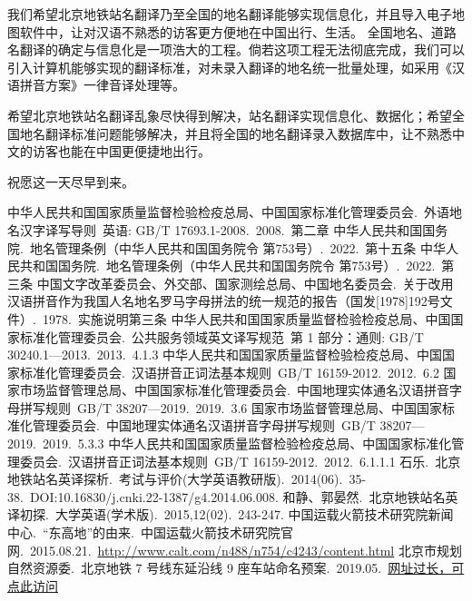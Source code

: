 \documentclass[a4paper,UTF8,12pt]{ctexart}
\begin{document}
    我们希望北京地铁站名翻译乃至全国的地名翻译能够实现信息化，并且导入电子地图软件中，让对汉语不熟悉的访客更方便地在中国出行、生活。
    全国地名、道路名翻译的确定与信息化是一项浩大的工程。倘若这项工程无法彻底完成，我们可以引入计算机能够实现的翻译标准，对未录入翻译的地名统一批量处理，如采用《汉语拼音方案》一律音译处理等。
    
    希望北京地铁站名翻译乱象尽快得到解决，站名翻译实现信息化、数据化；希望全国地名翻译标准问题能够解决，并且将全国的地名翻译录入数据库中，让不熟悉中文的访客也能在中国更便捷地出行。

    祝愿这一天尽早到来。

\begin{thebibliography}{100}

中华人民共和国国家质量监督检验检疫总局、中国国家标准化管理委员会.\ 外语地名汉字译写导则\ 英语: GB/T 17693.1-2008.\ 2008.\ 第二章
中华人民共和国国务院.\ 地名管理条例（中华人民共和国国务院令 第753号）.\ 2022.\ 第十五条
中华人民共和国国务院.\ 地名管理条例（中华人民共和国国务院令 第753号）.\ 2022.\ 第三条
中国文字改革委员会、外交部、国家测绘总局、中国地名委员会.\ 关于改用汉语拼音作为我国人名地名罗马字母拼法的统一规范的报告（国发[1978]192号文件）.\ 1978.\ 实施说明第三条
中华人民共和国国家质量监督检验检疫总局、中国国家标准化管理委员会.\ 公共服务领域英文译写规范\ 第 1 部分：通则: GB/T 30240.1—2013.\ 2013.\ 4.1.3
中华人民共和国国家质量监督检验检疫总局、中国国家标准化管理委员会.\ 汉语拼音正词法基本规则\ GB/T 16159-2012.\ 2012.\ 6.2
国家市场监督管理总局、中国国家标准化管理委员会.\ 中国地理实体通名汉语拼音字母拼写规则\ GB/T 38207—2019.\ 2019.\ 3.6
国家市场监督管理总局、中国国家标准化管理委员会.\ 中国地理实体通名汉语拼音字母拼写规则\ GB/T 38207—2019.\ 2019.\ 5.3.3
中华人民共和国国家质量监督检验检疫总局、中国国家标准化管理委员会.\ 汉语拼音正词法基本规则\ GB/T 16159-2012.\ 2012.\ 6.1.1.1
石乐.\ 北京地铁站名英译探析.\ 考试与评价(大学英语教研版).\ 2014(06).\ 35-38.\ DOI:10.16830/j.cnki.22-1387/g4.2014.06.008.
和静、郭晏然.\ 北京地铁站名英译初探.\ 大学英语(学术版).\ 2015,12(02).\ 243-247.
中国运载火箭技术研究院新闻中心.\ “东高地”的由来.\ 中国运载火箭技术研究院官网.\ 2015.08.21.\ \href{http://www.calt.com/n488/n754/c4243/content.html}{http://www.calt.com/n488/n754/c4243/content.html}
北京市规划自然资源委.\ 北京地铁 7 号线东延沿线 9 座车站命名预案.\ 2019.05.\ \href{https://web.archive.org/web/20190515054111/http://mini.eastday.com/bdmip/190515132414666.html}{网址过长，可点此访问}

\end{thebibliography}
\end{document}
